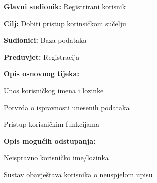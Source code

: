 				\noindent {}
					\begin{packed_item}
	
						\item \textbf{Glavni sudionik: }Registrirani korisnik
						\item  \textbf{Cilj:} Dobiti pristup korinsičkom sučelju
						\item  \textbf{Sudionici:} Baza podataka
						\item  \textbf{Preduvjet:} Registracija
						\item  \textbf{Opis osnovnog tijeka:}
						
						\item[] \begin{packed_enum}
	
							\item Unos korisničkog imena i lozinke
							\item Potvrda o ispravnosti unesenih podataka
							\item Pristup korisničkim funkcijama
							
						\end{packed_enum}
						
						\item  \textbf{Opis mogućih odstupanja:}
						
						\item[] \begin{packed_item}
	
							\item[2.a] Neispravno korisničko ime/lozinka
							
								\begin{packed_item}
								
									\item Sustav obavještava korisnika o neuspjelom upisu
									
								\end{packed_item}
							
						\end{packed_item}				
					\end{packed_item}
					
